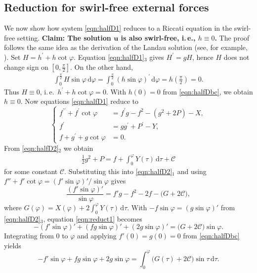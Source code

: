 \documentclass{amsart}
\newcommand{\Bu}{{\boldsymbol{u}}}
\newcommand{\mcC}{\mathcal{C}}
\begin{document}
\subsection{Reduction for swirl-free external forces}\label{sec:reductNo-swirl}
We now show how system \eqref{eqn:halfD1} reduces to a Riccati equation in the swirl-free setting.
{\bf Claim: The solution $\Bu$ is also swirl-free, i.\,e., $h\equiv0$.} 
The proof follows the same idea as the derivation of the Landau solution (see, for example, \cite[Theorem~8.1]{Tsai18}).
Set $H = h^\prime + h\cot \varphi $. Equation \eqref{eqn:halfD1}$_3$ gives $H^\prime = gH$,
hence $H$ does not change sign on $[0,\frac{\pi}{2}]$. On the other hand, 
\begin{align*}
\int_{0}^{\frac{\pi}{2}} H \sin \varphi\, \mathrm{d}\varphi = \int_0^{\frac{\pi}{2}} (h\sin \varphi)^\prime \, \mathrm{d}\varphi = h(\tfrac{\pi}{2})= 0. 
\end{align*}
Thus $H\equiv0$, i.\,e.\ $h^\prime + h \cot \varphi =0$. With $h(0)=0$ from \eqref{eqn:halfDbc}, we obtain $h\equiv0$.
Now equations \eqref{eqn:halfD1} reduce to 
\begin{equation}\label{eqn:halfD2}
\left\{ 
\begin{aligned}
    f^{\prime \prime} + f^\prime \cot \varphi &= f^\prime g - f^2 - ( g^2+2P) -X,\\
    f^\prime &= g g^\prime + P^\prime - Y, \\
    f+ g^\prime + g\cot \varphi &=0. 
\end{aligned}
\right.
\end{equation}
From \eqref{eqn:halfD2}$_2$ we obtain
\begin{align}\label{eqn:eqnforP}
\frac12 g^2 + P = f + \int_0^{\varphi} Y(\tau)\,\mathrm{d}\tau + \mcC
\end{align}
for some constant $\mcC$.  Substituting this into \eqref{eqn:halfD2}$_1$ and using
$f''+f'\cot\varphi = (f'\sin\varphi)'/\sin\varphi$ gives
\begin{equation}\label{eqn:reduct1}
\frac{(f'\sin\varphi)'}{\sin\varphi} = f'g - f^2 - 2f - \bigl(G+2\mcC\bigr),
\end{equation}
where $G(\varphi) = X(\varphi) + 2\int_0^{\varphi} Y(\tau)\,\mathrm{d}\tau$.
With $-f\sin\varphi = (g\sin\varphi)'$ from \eqref{eqn:halfD2}$_3$, equation \eqref{eqn:reduct1} becomes
\[
-(f'\sin\varphi)' + (fg\sin\varphi)' + (2g\sin\varphi)' = \bigl(G+2\mcC\bigr)\sin\varphi .
\]
Integrating from $0$ to $\varphi$ and applying $f'(0)=g(0)=0$ from \eqref{eqn:halfDbc} yields
\begin{equation}\label{eqn:reduct2}
-f'\sin\varphi + fg\sin\varphi + 2g\sin\varphi = \int_0^{\varphi} \bigl(G(\tau)+2\mcC\bigr)\sin\tau\,\mathrm{d}\tau .
\end{equation}
\end{document}

